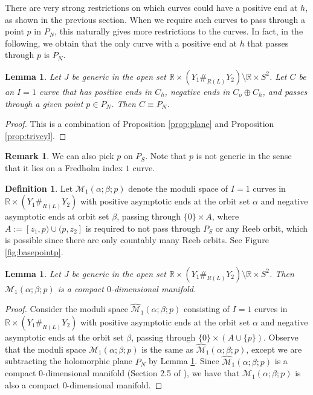 \documentclass{article}
\numberwithin{equation}{section}
\newtheorem{lemma}[theorem]{Lemma}
\theoremstyle{definition}
\newtheorem{definition}[theorem]{Definition}
\newtheorem{remark}[theorem]{Remark}
\newcommand{\R}{\mathbb{R}}
\begin{document}
There are very strong restrictions on which curves could have a positive end at $h$, as shown in the previous section. When we require such curves to pass through a point $p$ in $P_N$, this naturally gives more restrictions to the curves. In fact, in the following, we obtain that the only curve with a positive end at $h$ that passes through $p$ is $P_N$. 

\begin{lemma}
\label{lem:curvethrup}
Let $J$ be generic in the open set $\mathbb{R}\times (Y_1\#_{R(L)} Y_2)\setminus \mathbb{R} \times S^2$. Let $C$ be an $I=1$ curve that has positive ends in $C_h$, negative ends in $C_o\oplus C_h$, and passes through a given point $p\in P_N$. Then $C \equiv P_N$.

\end{lemma}
\begin{proof}
This is a combination of Proposition \ref{prop:plane} and Proposition \ref{prop:trivcyl}.
\end{proof}

\begin{remark}
We can also pick $p$ on $P_S$. Note that $p$ is not generic in the sense that it lies on a Fredholm index $1$ curve.
\end{remark}

\begin{definition}
Let $\mathcal{M}_{1}(\alpha; \beta; p)$ denote the moduli space of $I = 1$ curves in $\R \times (Y_1 \#_{R(L)} Y_2)$ with positive asymptotic ends at the orbit set $\alpha$ and negative asymptotic ends at orbit set $\beta$, passing through $\{0\} \times A$, where $A:=[z_1, p) \cup (p, z_2]$ is required to not pass through $P_S$ or any Reeb orbit, which is possible since there are only countably many Reeb orbits. See Figure \ref{fig:basepointp}.
\end{definition}

\begin{lemma}
Let $J$ be generic in the open set $\mathbb{R}\times (Y_1\#_{R(L)} Y_2)\setminus \mathbb{R} \times S^2$. Then $\mathcal{M}_1(\alpha; \beta; p)$ is a compact $0$-dimensional manifold.
\end{lemma}
\begin{proof}
Consider the moduli space $\widehat{\mathcal{M}}_1(\alpha; \beta; p)$ consisting of $I = 1$ curves in $\R \times (Y_1 \#_{R(L)} Y_2)$ with positive asymptotic ends at the orbit set $\alpha$ and negative asymptotic ends at the orbit set $\beta$, passing through $\{0\} \times (A \cup \{p\})$.
Observe that the moduli space $\mathcal{M}_1(\alpha; \beta; p)$ is the same as $\widehat{\mathcal{M}}_1(\alpha; \beta; p)$, except we are subtracting the holomorphic plane $P_N$ by Lemma \ref{lem:curvethrup}. Since $\widehat{\mathcal{M}}_1(\alpha; \beta; p)$ is a compact $0$-dimensional manifold (Section 2.5 of \cite{HT_weinstein}), we have that $\mathcal{M}_1(\alpha; \beta; p)$ is also a compact $0$-dimensional manifold.
\end{proof}
\end{document}

